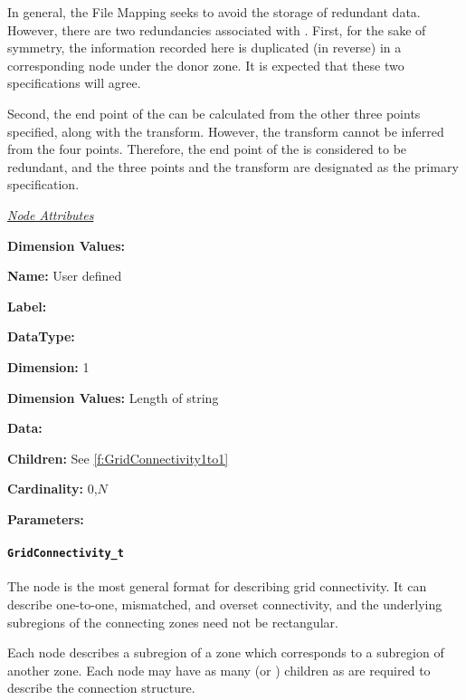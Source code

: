 In general, the File Mapping seeks to avoid the storage of
redundant data. However, there are two redundancies associated with
. First, for the sake of symmetry, the
information recorded here is duplicated (in reverse) in a corresponding
node under the donor zone. It is expected that these two specifications
will agree.

Second, the end point of the  can be
calculated from the other three points specified, along with the
transform. However, the transform cannot be inferred from the four
points. Therefore, the end point of the  is
considered to be redundant, and the three points and the transform are
designated as the primary specification.

\textit{\uline{Node Attributes}}
\begin{Ventryic}{\textbf{Dimension Values:}}
\item [\textbf{Name:}]
      User defined
\item [\textbf{Label:}]
\item [\textbf{DataType:}]
\item [\textbf{Dimension:}]
      1
\item [\textbf{Dimension Values:}]
      Length of string
\item [\textbf{Data:}]
\item [\textbf{Children:}]
      See \autoref{f:GridConnectivity1to1}
\item [\textbf{Cardinality:}]
      0,$N$
\item [\textbf{Parameters:}]
\end{Ventryic}

\paragraph{\texttt{GridConnectivity\_t}}
\label{s:GridConnectivity}

The  node is the most general format for
describing grid connectivity. It can describe one-to-one, mismatched,
and overset connectivity, and the underlying subregions of the
connecting zones need not be rectangular.

Each  node describes a subregion
of a zone which corresponds to a subregion of another
zone. Each  node may have as many
 (or ) children
as are required to describe the connection structure.

